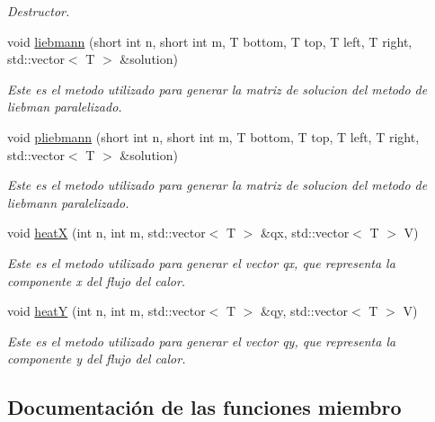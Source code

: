 \begin{DoxyCompactItemize}
\begin{DoxyCompactList}\small\item\em Destructor. \end{DoxyCompactList}\item 
void \hyperlink{classmethods_1_1Liebmann_a422c224247ccf4cb7e997553436aa59e}{liebmann} (short int n, short int m, T bottom, T top, T left, T right, std\+::vector$<$ T $>$ \&solution)
\begin{DoxyCompactList}\small\item\em Este es el metodo utilizado para generar la matriz de solucion del metodo de liebman paralelizado. \end{DoxyCompactList}\item 
void \hyperlink{classmethods_1_1Liebmann_aa89b8c2b82ca711b58fa318b1279ace0}{pliebmann} (short int n, short int m, T bottom, T top, T left, T right, std\+::vector$<$ T $>$ \&solution)
\begin{DoxyCompactList}\small\item\em Este es el metodo utilizado para generar la matriz de solucion del metodo de liebmann paralelizado. \end{DoxyCompactList}\item 
void \hyperlink{classmethods_1_1Liebmann_a21db65627b967d86d1cd5fd0c60e9cfb}{heatX} (int n, int m, std\+::vector$<$ T $>$ \&qx, std\+::vector$<$ T $>$ V)
\begin{DoxyCompactList}\small\item\em Este es el metodo utilizado para generar el vector qx, que representa la componente x del flujo del calor. \end{DoxyCompactList}\item 
void \hyperlink{classmethods_1_1Liebmann_ade173b06f3fb835d5bab07c9307052db}{heatY} (int n, int m, std\+::vector$<$ T $>$ \&qy, std\+::vector$<$ T $>$ V)
\begin{DoxyCompactList}\small\item\em Este es el metodo utilizado para generar el vector qy, que representa la componente y del flujo del calor. \end{DoxyCompactList}\end{DoxyCompactItemize}


\subsection{Documentación de las funciones miembro}
